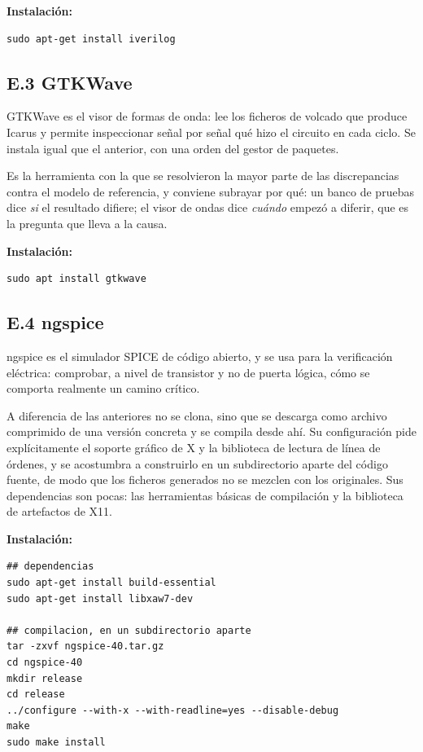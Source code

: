 \textbf{Instalación:}

\begin{verbatim}
sudo apt-get install iverilog
\end{verbatim}

\subsection{E.3 GTKWave}\label{e.3-gtkwave}

GTKWave es el visor de formas de onda: lee los ficheros de volcado que
produce Icarus y permite inspeccionar señal por señal qué hizo el
circuito en cada ciclo. Se instala igual que el anterior, con una orden
del gestor de paquetes.

Es la herramienta con la que se resolvieron la mayor parte de las
discrepancias contra el modelo de referencia, y conviene subrayar por
qué: un banco de pruebas dice \emph{si} el resultado difiere; el visor
de ondas dice \emph{cuándo} empezó a diferir, que es la pregunta que
lleva a la causa.

\textbf{Instalación:}

\begin{verbatim}
sudo apt install gtkwave
\end{verbatim}

\subsection{E.4 ngspice}\label{e.4-ngspice}

ngspice es el simulador SPICE de código abierto, y se usa para la
verificación eléctrica: comprobar, a nivel de transistor y no de puerta
lógica, cómo se comporta realmente un camino crítico.

A diferencia de las anteriores no se clona, sino que se descarga como
archivo comprimido de una versión concreta y se compila desde ahí. Su
configuración pide explícitamente el soporte gráfico de X y la
biblioteca de lectura de línea de órdenes, y se acostumbra a construirlo
en un subdirectorio aparte del código fuente, de modo que los ficheros
generados no se mezclen con los originales. Sus dependencias son pocas:
las herramientas básicas de compilación y la biblioteca de artefactos de
X11.

\textbf{Instalación:}

\begin{verbatim}
## dependencias
sudo apt-get install build-essential
sudo apt-get install libxaw7-dev

## compilacion, en un subdirectorio aparte
tar -zxvf ngspice-40.tar.gz
cd ngspice-40
mkdir release
cd release
../configure --with-x --with-readline=yes --disable-debug
make
sudo make install
\end{verbatim}

